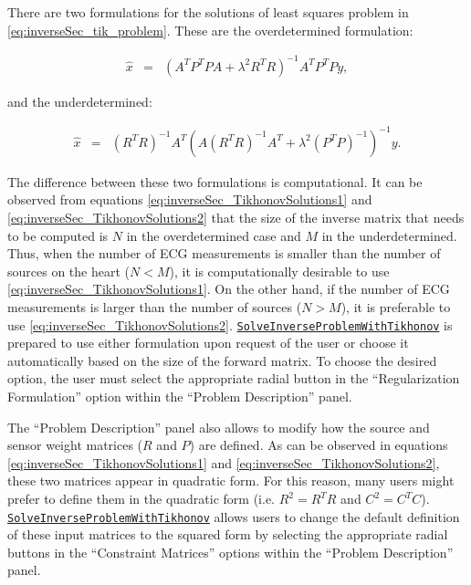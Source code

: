     There are two formulations for the solutions of least squares problem in \autoref{eq:inverseSec_tik_problem}.
    These are the overdetermined formulation:
    \begin{center}
    \begin{eqnarray}
        \hat{x}   &=& \left(A^T P^TPA + \lambda^{2}R^TR\right)^{-1} A^T P^TP y,
    \label{eq:inverseSec_TikhonovSolutions1}
    \end{eqnarray}
    \end{center}    
    and the underdetermined:
    \begin{center}
    \begin{eqnarray}
        \hat{x}  &=& (R^TR)^{-1} A^T \left( A(R^TR)^{-1}A^T + \lambda^2 (P^TP)^{-1}  \right)^{-1}y.
    \label{eq:inverseSec_TikhonovSolutions2}
    \end{eqnarray}
    \end{center}
    The difference between these two formulations is computational. 
    It can be observed from equations \ref{eq:inverseSec_TikhonovSolutions1} and \ref{eq:inverseSec_TikhonovSolutions2} that the size of the inverse matrix that needs to be computed is $N$ in the overdetermined case and $M$ in the underdetermined.
    Thus, when the number of ECG measurements is smaller than the number of sources on the heart ($N<M$), it is computationally desirable to use \autoref{eq:inverseSec_TikhonovSolutions1}.
    On the other hand, if the number of ECG measurements is larger than the number of sources ($N>M$), it is preferable to use \autoref{eq:inverseSec_TikhonovSolutions2}.
    \href{http://scirundocwiki.sci.utah.edu/SCIRunDocs/index.php/CIBC:Documentation:SCIRun:Reference:BioPSE:SolveInverseProblemWithTikhonov}{{\tt SolveInverseProblemWithTikhonov}} is prepared to use either formulation upon request of the user or choose it automatically based on the size of the forward matrix.
    To choose the desired option, the user must select the appropriate radial button in the ``Regularization Formulation'' option within the  ``Problem Description'' panel.
    
    The ``Problem Description'' panel also allows to modify how the source and sensor weight matrices ($R$ and $P$) are defined.
    As can be observed in equations \ref{eq:inverseSec_TikhonovSolutions1} and \ref{eq:inverseSec_TikhonovSolutions2}, these two matrices appear in quadratic form. For this reason, many users might prefer to define them in the quadratic form (i.e. $R^2=R^TR$ and $C^2=C^TC$).
    \href{http://scirundocwiki.sci.utah.edu/SCIRunDocs/index.php/CIBC:Documentation:SCIRun:Reference:BioPSE:SolveInverseProblemWithTikhonov}{{\tt SolveInverseProblemWithTikhonov}} allows users to change the default definition of these input matrices to the squared form by selecting the appropriate radial buttons in the ``Constraint Matrices'' options within the  ``Problem Description'' panel.
    
